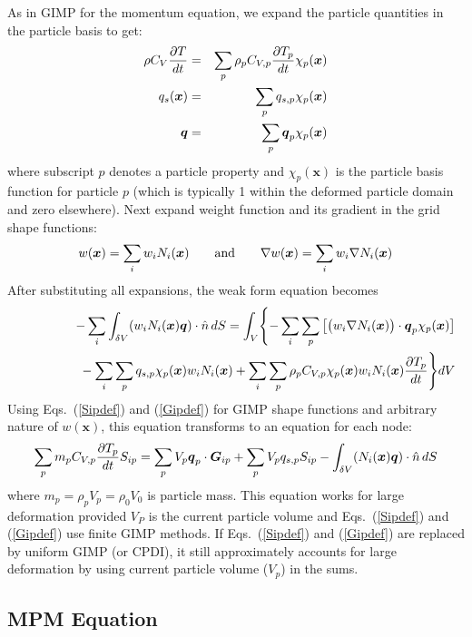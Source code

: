 \documentclass[11pt]{article}
\renewcommand{\vec}[1]{\boldsymbol{#1}}
\begin{document}
As in GIMP for the momentum equation, we expand the particle quantities in the particle basis to get:
\begin{eqnarray}
    \rho C_V {\partial T\over dt} & = & \sum_p \rho_p C_{V,p} {\partial T_p\over dt} \chi_p(\vec x) \\
    q_s(\vec x) & = & \sum_p q_{s,p} \chi_p(\vec x) \\
    \vec q & = & \sum_p \vec q_p\chi_p(\vec x)
\end{eqnarray}
where subscript $p$ denotes a particle property and $\chi_p(\vec x)$ is the particle basis function for particle $p$ (which is typically 1 within the deformed particle domain and zero elsewhere). Next expand weight function and its gradient in the grid shape functions:
\begin{equation}
   w(\vec x)=\sum_i w_i N_i(\vec x) \qquad {\rm and} \qquad \nabla w(\vec x)=\sum_i w_i \nabla N_i(\vec x)
\end{equation}
After substituting all expansions, the weak form equation becomes
\begin{eqnarray}
&& -\sum_i \int_{\delta V} (w_iN_i(\vec x)\vec q)\cdot \hat n \thinspace dS = 
\int_{V} \Biggl\{-\sum_i\sum_p\left[\bigl(w_i\nabla N_i(\vec x)\bigr)\cdot \vec q_p\chi_p(\vec x)\right] \\
&& \qquad\qquad\mbox{} - 
\sum_i\sum_p q_{s,p}\chi_p(\vec x)w_iN_i(\vec x)
+  \sum_i\sum_p \rho_p C_{V,p}\chi_p(\vec x) w_iN_i(\vec x){\partial T_p\over dt}\Biggr\} dV
\end{eqnarray}
Using Eqs.~(\ref{Sipdef}) and (\ref{Gipdef}) for GIMP shape functions and arbitrary nature of $w(\vec x)$, this equation transforms  to an equation for each node:
\begin{equation}
    \sum_p  m_p C_{V,p}{\partial T_p\over dt}S_{ip} = \sum_p V_p \vec q_p\cdot \vec G_{ip}  + \sum_p  V_p q_{s,p} S_{ip}  - 
 \int_{\delta V} (N_i(\vec x)\vec q)\cdot \hat n \thinspace dS
\end{equation}
where $m_p = \rho_p V_p = \rho_0 V_0$ is particle mass. This equation works for large deformation provided $V_P$ is the current particle volume and Eqs.~(\ref{Sipdef}) and (\ref{Gipdef}) use finite GIMP methods. If Eqs.~(\ref{Sipdef}) and (\ref{Gipdef}) are replaced by uniform GIMP (or CPDI), it still approximately accounts for large deformation by using current particle volume ($V_p$) in the sums.

\subsection{MPM Equation}
\end{document}
